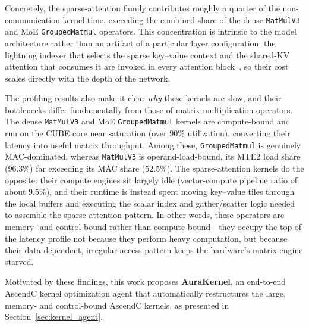 Concretely, the sparse-attention family contributes roughly a quarter of the non-communication kernel time, exceeding the combined share of the dense \texttt{MatMulV3} and MoE \texttt{GroupedMatmul} operators.
This concentration is intrinsic to the model architecture rather than an artifact of a particular layer configuration: the lightning indexer that selects the sparse key--value context and the shared-KV attention that consumes it are invoked in every attention block~\citep{deepseekai2026deepseekv4highlyefficientmilliontoken}, so their cost scales directly with the depth of the network.

The profiling results also make it clear \emph{why} these kernels are slow, and their bottlenecks differ fundamentally from those of matrix-multiplication operators.
The dense \texttt{MatMulV3} and MoE \texttt{GroupedMatmul} kernels are compute-bound and run on the CUBE core near saturation (over $90\%$ utilization), converting their latency into useful matrix throughput. Among these, \texttt{GroupedMatmul} is genuinely MAC-dominated, whereas \texttt{MatMulV3} is operand-load-bound, its MTE2 load share ($96.3\%$) far exceeding its MAC share ($52.5\%$).
The sparse-attention kernels do the opposite: their compute engines sit largely idle (vector-compute pipeline ratio of about $9.5\%$), and their runtime is instead spent moving key--value tiles through the local buffers and executing the scalar index and gather/scatter logic needed to assemble the sparse attention pattern.
In other words, these operators are memory- and control-bound rather than compute-bound---they occupy the top of the latency profile not because they perform heavy computation, but because their data-dependent, irregular access pattern keeps the hardware's matrix engine starved.

Motivated by these findings, this work proposes \textbf{AuraKernel}, an end-to-end AscendC kernel optimization agent that automatically restructures the large, memory- and control-bound AscendC kernels, as presented in Section~\ref{sec:kernel_agent}. 


